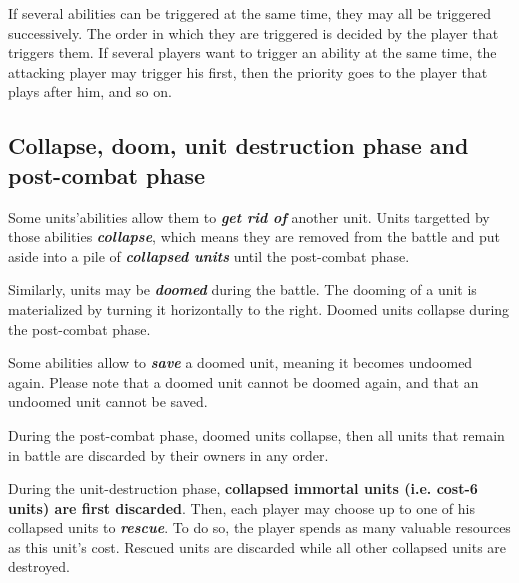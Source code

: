 \documentclass[a4paper]{article}
\begin{document}
    If several abilities can be triggered at the same time,
    they may all be triggered successively.
    The order in which they are triggered is decided by the player that triggers them.
    If several players want to trigger an ability at the same time,
    the attacking player may trigger his first,
    then the priority goes to the player that plays after him, and so on.
    

  \subsection{Collapse, doom, unit destruction phase and post-combat phase}
  
    Some units'abilities allow them to \textbf{\textit{get rid of}} another unit.
    Units targetted by those abilities \textbf{\textit{collapse}},
    which means they are removed from the battle and put aside into a pile
    of \textbf{\textit{collapsed units}} until the post-combat phase.
    
    Similarly, units may be \textbf{\textit{doomed}} during the battle.
    The dooming of a unit is materialized by turning it horizontally to the right.
    Doomed units collapse during the post-combat phase.

    Some abilities allow to \textbf{\textit{save}} a doomed unit,
    meaning it becomes undoomed again.
    Please note that a doomed unit cannot be doomed again,
    and that an undoomed unit cannot be saved.
    
    During the post-combat phase, doomed units collapse,
    then all units that remain in battle are discarded by
    their owners in any order.
    
    During the unit-destruction phase, \textbf{collapsed immortal units
    (i.e. cost-6 units) are first discarded}.
    Then, each player may choose up to one of his collapsed units to
    \textbf{\textit{rescue}}.
    To do so, the player spends as many valuable resources as this unit's cost.
    Rescued units are discarded while all other collapsed units are destroyed.
    
    
    
\end{document}
